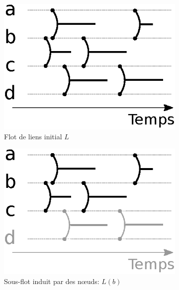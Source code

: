 \begin{figure}[]
\centering
	\begin{subfigure}{0.25\linewidth}
		\includegraphics[width=\linewidth]{img/Intro/sous_flots.eps}\hfill
		\caption{Flot de liens initial $L$}
		\label{fig:exemple_sous_flot_init}	
	\end{subfigure}\hspace{0.1\linewidth}
	\begin{subfigure}{0.25\linewidth}
		\includegraphics[width=\linewidth]{img/Intro/sous_flots1.eps}\hfill
		\caption{Sous-flot induit par des n\oe{}uds: $L(b)$}	
		\label{fig:exemple_sous_flot1}	
	\end{subfigure}\hspace{0.1\linewidth}
	\begin{subfigure}{0.25\linewidth}

\end{subfigure}
\end{figure}
